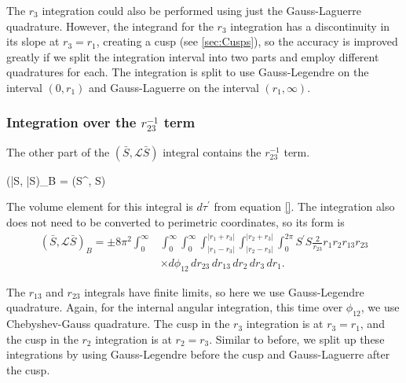 \documentclass[Dissertation.tex]{subfiles}
\begin{document}
The $r_3$ integration could also be performed using just the Gauss-Laguerre 
quadrature. However, the integrand for the $r_3$ integration has a 
discontinuity in its slope at $r_3=r_1$, creating a cusp
(see \cref{sec:Cusps}), so the accuracy is improved greatly if we split the
integration interval into two parts and employ different quadratures for each.
The integration is split to use Gauss-Legendre on the interval $(0,r_1)$ and
Gauss-Laguerre on the interval $(r_1,\infty)$.

\subsubsection{Integration over the \texorpdfstring{$r_{23}^{-1}$} {1/r23} term}
\label{sec:LongLongR23}
The other part of the $(\bar{S},\mathcal{L} \bar{S})$ integral contains the $r_{23}^{-1}$ term.

\beq
(\bar{S}, \bar{S})_B = \pm \left(S^\prime,  S\right)
\eeq


\noindent The volume element for this integral is $d\tau^\prime$ from equation \ref{}.  The integration also does not need to be converted to perimetric coordinates, so its form is
\begin{align}
(\bar{S},\mathcal{L} \bar{S})_B = \pm 8\pi^2 \int_0^\infty & \int_0^\infty \int_0^\infty \int_{|r_1 - r_3|}^{|r_1 + r_3|} \int_{|r_2 - r_3|}^{|r_2 + r_3|} \int_0^{2\pi}  S^\prime S \frac{2}{r_{23}} r_1 r_2 r_{13} r_{23} \nonumber \\
& \times d\phi_{12}\, dr_{23}\, dr_{13}\, dr_2\, dr_3\, dr_1.
\end{align}

The $r_{13}$ and $r_{23}$ integrals have finite limits, so here we use Gauss-Legendre quadrature.  Again, for the internal angular integration, this time over $\phi_{12}$, we use Chebyshev-Gauss quadrature.  The cusp in the $r_3$ integration is at $r_3 = r_1$, and the cusp in the $r_2$ integration is at $r_2 = r_3$.  Similar to before, we split up these integrations by using Gauss-Legendre before the cusp and Gauss-Laguerre after the cusp.
\end{document}

